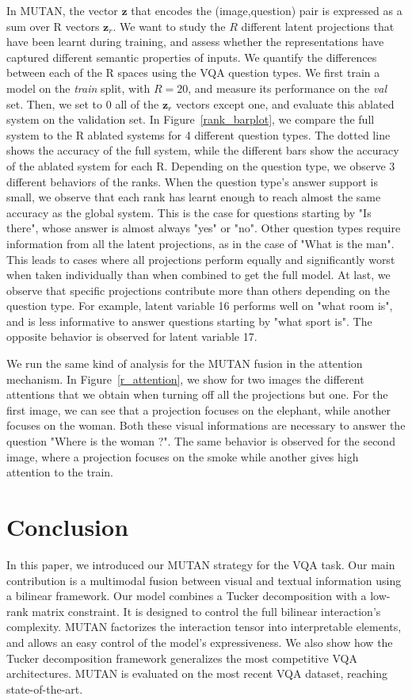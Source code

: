 \documentclass[10pt,twocolumn,letterpaper]{article}
\newcommand{\z}{\mathbf{z}}
\begin{document}
In MUTAN, the vector $\z$ that encodes the (image,question) pair is expressed as a sum over R vectors $\z_r$. We want to study the $R$ different latent projections that have been learnt during training, and assess whether the representations have captured different semantic properties of inputs. We quantify the differences between each of the R spaces using the VQA question types. We first train a model on the \textit{train} split, with $R=20$, and measure its performance on the \textit{val} set. Then, we set to 0 all of the $\z_r$ vectors except one, and evaluate this ablated system on the validation set. In Figure~\ref{rank_barplot}, we compare the full system to the R ablated systems for 4 different question types. The dotted line shows the accuracy of the full system, while the different bars show the accuracy of the ablated system for each R. Depending on the question type, we observe 3 different behaviors of the ranks. When the question type's answer support is small, we observe that each rank has learnt enough to reach almost the same accuracy as the global system. This is the case for questions starting by "Is there", whose answer is almost always "yes" or "no". Other question types require information from all the latent projections, as in the case of "What is the man". This leads to cases where all projections perform equally and significantly worst when taken individually than when combined to get the full model. At last, we observe that specific projections contribute more than others depending on the question type. For example, latent variable 16 performs well on "what room is", and is less informative to answer questions starting by "what sport is". The opposite behavior is observed for latent variable 17.

We run the same kind of analysis for the MUTAN fusion in the attention mechanism. In Figure~\ref{r_attention}, we show for two images the different attentions that we obtain when turning off all the projections but one. For the first image, we can see that a projection focuses on the elephant, while another focuses on the woman. Both these visual informations are necessary to answer the question "Where is the woman ?". The same behavior is observed for the second image, where a projection focuses on the smoke while another gives high attention to the train.
 \section{Conclusion}
In this paper, we introduced our MUTAN strategy for the VQA task. Our main contribution is a multimodal fusion between visual and textual information using a bilinear framework. Our model combines a Tucker decomposition with a low-rank matrix constraint. It is designed to control the full bilinear interaction's complexity. 
MUTAN factorizes the interaction tensor into interpretable elements, and allows an easy control of the model's expressiveness. We also show how the Tucker decomposition framework generalizes the most competitive VQA architectures. MUTAN is evaluated on the most recent VQA dataset, reaching state-of-the-art.
 
\end{document}
